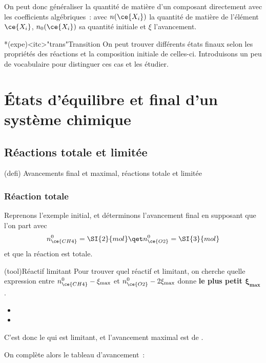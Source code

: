 \documentclass[../../main/main.tex]{subfiles}
\begin{document}
On peut donc généraliser la quantité de matière d'un composant directement avec
les coefficients algébriques~:
\psw{
	\[
		\boxed{n(\ce{X_i}) = n_0(\ce{X_i}) + \nu_i\xi}
	\]
}
avec $n(\ce{X_i})$ la quantité de matière de l'élément $\ce{X_i}$,
$n_0(\ce{X_i})$ sa quantité initiale et $\xi$ l'avancement.

\begin{tcb}*(expe)<itc>"trans"{Transition}
	On peut trouver différents états finaux selon les propriétés des réactions
	et la composition initiale de celles-ci. Introduisons un peu de vocabulaire
	pour distinguer ces cas et les étudier.
\end{tcb}

\section{États d'équilibre et final d'un système chimique}
\subsection{Réactions totale et limitée}

\begin{tcb}[label=def:final, sidebyside](defi)
	{Avancements final et maximal, réactions totale et limitée}
	\tcblower
\end{tcb}

\subsubsection{Réaction totale}

Reprenons l'exemple initial, et déterminons l'avancement final en supposant que
l'on part avec
\[
	n_{\ce{CH4}}^0 = \SI{2}{mol} \qet n_{\ce{O2}}^0 = \SI{3}{mol}
\]
et que la réaction est totale.

\begin{tcb}(tool){Réactif limitant}
	Pour trouver quel réactif et limitant, on cherche quelle expression entre
	$n_{\ce{CH4}}^0-\xi_{\max} $ et $n_{\ce{O2}}^0-2\xi_{\max} $ donne \textbf{le
		plus petit $\mathbf{\xi_{\max}}$}.
	\begin{itemize}
		\item {}
		\item {}
	\end{itemize}
	C'est donc le  qui est limitant, et l'avancement
	maximal est de .
\end{tcb}
On complète alors le tableau d'avancement~:
\end{document}
